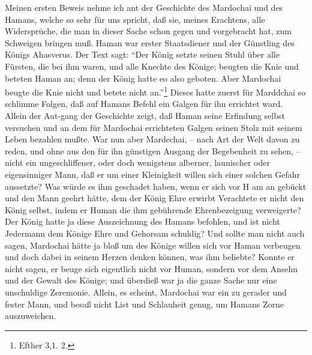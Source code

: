 Meinen ersten Beweis nehme ich ant der Geschichte des Mardochai und des Hamans, welche so sehr für uns spricht, daß sie, meines Erachtens, alle Widersprüche, die man in dieser Sache schon gegen und vorgebracht hat, zum Schweigen bringen muß. Haman war erster Staatsdiener und der Günstling des Königs Ahasverus. Der Text sagt: "`Der König setzte seinen Stuhl über alle Fürsten, die bei ihm waren, und alle Knechte des Könige; beugten die Knie und beteten Haman an; denn der König hatte eo also geboten. Aber Mardochai beugte die Knie nicht und betete nicht an."'\footnote{Efther 3,1. 2.} Dieses hatte zuerst für Marddchai so schlimme Folgen, daß auf Hamans Befehl ein Galgen für ihn errichtet ward. Allein der Aut-gang der Geschichte zeigt, daß Haman seine Erfindung selbst versuchen und an dem für Mardochai errichteten Galgen seinen Stolz mit seinem Leben bezahlen mußte. War nun aber Mardechai, -- nach Art der Welt davon zu reden, und ohne aus den für ihn günstigen Ausgang der Begebenheit zu sehen, -- nicht ein ungeschliffener, oder doch wenigstens alberner, launischer oder eigensinniger Mann, daß er um einer Kleinigkeit willen sich einer solchen Gefahr aussetzte? Was würde es ihm geschadet haben, wenn er sich vor
H am an gebückt und den Mann geehrt hätte, dem der König Ehre erwirbt Verachtete er nicht den König selbst, indem er Human die ihm gebührende Ehrenbezeigung verweigerte? Der König hatte ja diese Auszeichnung des Hamans befohlen, und ist nicht Jedermann dem Könige Ehre und Gehorsam schuldig? Und sollte man nicht auch sagen, Mardochai hätte ja bloß um des Könige willen sich vor Haman verbeugen und doch dabei in seinem Herzen denken können, was ihm beliebte? Konnte er nicht sagen, er beuge sich eigentlich nicht vor Human, sondern vor dem Ansehn und der Gewalt des Könige; und überdieß war ja die ganze Sache nur eine unschuldige Zeremonie. Allein, es scheint, Mardochai war ein zu gerader und fester Mann, und besaß nicht List und Schlauheit genug, um Hamans Zorne auszuweichen.

